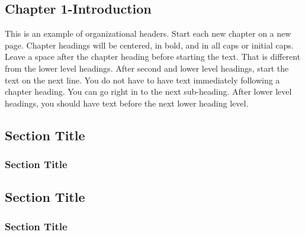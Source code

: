 \newpage
\setcounter{page}{1}
\setcounter{section}{1}
\begin{singlespace}
\section{\protect \centering Chapter 1-Introduction}
\end{singlespace}
\setcounter{section}{1}
\doublespacing
\indent This is an example of organizational headers. Start each new chapter on a
new page. Chapter headings will be centered, in bold, and in all caps or initial
caps. \\
\indent Leave a space after the chapter heading before starting the text. That is
different from the lower level headings. After second and lower level headings,
start the text on the next line. You do not have to have text immediately following
a chapter heading. You can go right in to the next sub-heading. After lower level
headings, you should have text before the next lower heading level.
\subsection {\normalsize Section Title}
{\addtolength{\leftskip}{0.5in}
\subsubsection {\normalsize Section Title}
}
\subsection {\normalsize Section Title}
{\addtolength{\leftskip}{0.5in}
\subsubsection {\normalsize Section Title}
}
